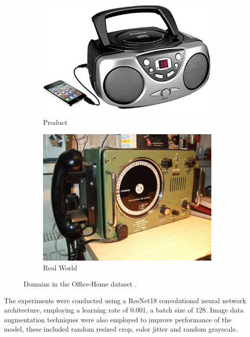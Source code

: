 \documentclass[10pt,twocolumn,letterpaper]{article}
\begin{document}
\begin{figure}[!htbp]
\begin{adjustbox}{minipage=\linewidth,scale=0.8}
  \begin{subfigure}[b]{0.45\columnwidth}
\centering
    \includegraphics[width=\linewidth]{Figures/Product_Radio.jpg}
    \caption{Product}
    \label{fig:short-c}
  \end{subfigure}
  \hfill
  \begin{subfigure}[b]{0.45\columnwidth}
\centering
    \includegraphics[width=\linewidth]{Figures/RealWorld_Radio.jpg}
    \caption{Real World}
    \label{fig:short-d}
  \end{subfigure}
\end{adjustbox}
  \caption{Domains in the Office-Home dataset \cite{OfficeHome}.}
  \label{fig:domains}
\end{figure}

The experiments were conducted using a ResNet18 convolutional neural network architecture, employing a learning rate of 0.001, a batch size of 128. Image data augmentation techniques were also employed to improve performance of the model, these included random resized crop, color jitter and random grayscale. 
\end{document}
